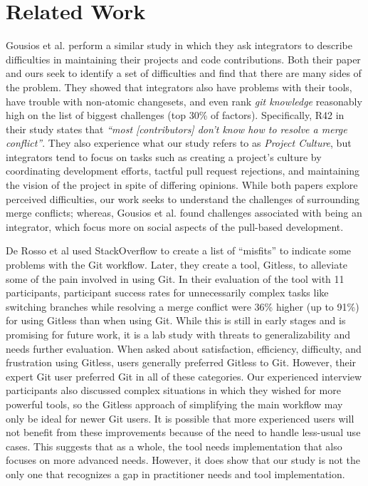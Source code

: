 \section{Related Work}\label{related_work}

Gousios et al. \cite{integrator_perspective} perform a similar study in which they ask integrators to describe difficulties in maintaining their projects and code contributions. 
Both their paper and ours seek to identify a set of difficulties and find that there are many sides of the problem. They showed that integrators also have problems with their tools, have trouble with non-atomic changesets, and even rank \textit{git knowledge} reasonably high on the list of biggest challenges (top 30\% of factors). Specifically, R42 in their study states that \textit{``most [contributors] don’t know
how to resolve a merge conflict''}. They also experience what our study refers to as \textit{Project Culture}, but integrators tend to focus on tasks such as creating a project's culture by coordinating development efforts, tactful pull request rejections, and maintaining the vision of the project in spite of differing opinions. While both papers explore perceived difficulties, our work seeks to understand the challenges of surrounding merge conflicts; whereas, Gousios et al. found challenges associated with being an integrator, which focus more on social aspects of the pull-based development.

De Rosso et al \cite{DeRosso2016} used StackOverflow to create a list of ``misfits'' to indicate some problems with the Git workflow. Later, they create a tool, Gitless, to alleviate some of the pain involved in using Git. In their evaluation of the tool with 11 participants, participant success rates for unnecessarily complex tasks like  switching branches while resolving a merge conflict were 36\% higher (up to 91\%) for using Gitless than when using Git. While this is still in early stages and is promising for future work, it is a lab study with threats to generalizability and needs further evaluation. 
 When asked about satisfaction, efficiency, difficulty, and frustration using Gitless, users generally preferred Gitless to Git. However, their expert Git user preferred Git in all of these categories. Our experienced interview participants also discussed complex situations in which they wished for more powerful tools, so the Gitless approach of simplifying the main workflow may only be ideal for newer Git users. It is possible that more experienced users will not benefit from these improvements because of the need to handle less-usual use cases. This suggests that as a whole, the tool needs implementation that also focuses on more advanced needs. However, it does show that our study is not the only one that recognizes a gap in practitioner needs and tool implementation.

